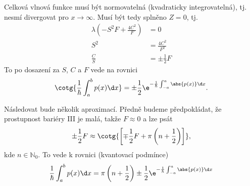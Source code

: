 \begin{solution}
\begin{enumerate}
		Celková vlnová funkce musí být normovatelná (kvadraticky integrovatelná), tj. nesmí divergovat  pro $x\rightarrow\infty$.
		Musí být tedy splněno $Z=0$, tj.
		\begin{align}
			\lambda\left(-S^{2}F+\frac{4C^{2}}{F}\right)&=0\nonumber\\
			S^{2}&=\frac{4C^{2}}{F^{2}}\nonumber\\
			\frac{C}{S}&=\pm\frac{1}{2}F
		\end{align}
		To po dosazení za $S$, $C$ a $F$ vede na rovnici
		\begin{align}
			\cotg{\frac{1}{\hbar}\int_{a}^{b}p(x)\d x}=\pm\frac{1}{2}\e^{-\frac{1}{\hbar}\int_{-a}^{a}\abs{p(x)}\d x}.
		\end{align}
		
		Následovat bude několik aproximací. 
		Předně budeme předpokládat, že prostupnost bariéry III je malá, takže $F\approx0$ a lze psát
		\begin{equation}
			\pm\frac{1}{2}F\approx\cotg{\left[\mp\frac{1}{2}F+\pi\left(n+\frac{1}{2}\right)\right]},
		\end{equation}
		kde $n\in\mathbb{N}_{0}$.
		To vede k rovnici (kvantovací podmínce)
		\begin{equation}
			\label{eq:DoubleWellE}
			\frac{1}{\hbar}\int_{a}^{b}p(x)\d x=\pi\left(n+\frac{1}{2}\right)\pm\frac{1}{2}\e^{-\frac{1}{\hbar}\int_{-a}^{a}\abs{p(x)}\d x}
		\end{equation}
	

\end{enumerate}
\end{solution}
